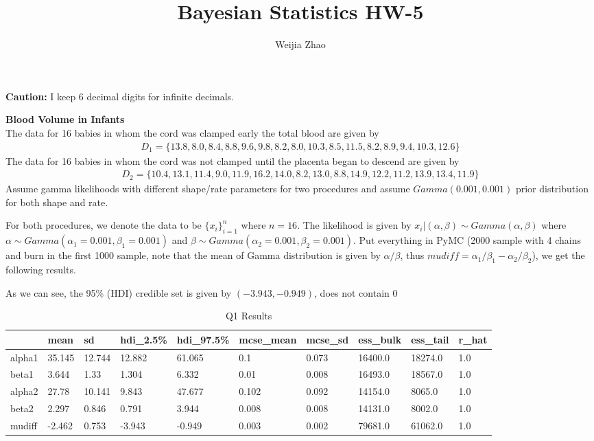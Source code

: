 \documentclass{homeworg}
\title{Bayesian Statistics HW-5}
\author{Weijia Zhao}
\begin{document}
\maketitle

\textbf{Caution:} I keep 6 decimal digits for infinite decimals.

\exercise 
\textbf{Blood Volume in Infants} \\
The data for 16 babies in whom the cord was clamped early the total blood are given by 
\begin{align*}
D_1=\{13.8,8.0,8.4,8.8,9.6,9.8,8.2,8.0,10.3,8.5,11.5,8.2,8.9,9.4,10.3,12.6\}
\end{align*}
The data for 16 babies in whom the cord was not clamped until the placenta began to descend are given by 
\begin{align*}
D_2=\{10.4,13.1,11.4,9.0,11.9,16.2,14.0,8.2,13.0,8.8,14.9,12.2,11.2,13.9,13.4,11.9\}
\end{align*}
Assume gamma likelihoods with different shape/rate parameters for two procedures and assume $Gamma(0.001,0.001)$ prior distribution for both shape and rate.

For both procedures, we denote the data to be $\{x_i\}_{i=1}^n$ where $n=16$. The likelihood is given by $x_i|(\alpha,\beta)\sim Gamma(\alpha,\beta)$ where $\alpha \sim Gamma(\alpha_1=0.001,\beta_1=0.001)$ and $\beta \sim Gamma(\alpha_2=0.001,\beta_2=0.001)$. Put everything in PyMC (2000 sample with 4 chains and burn in the first 1000 sample, note that the mean of Gamma distribution is given by $\alpha/\beta$, thus $mudiff=\alpha_1/\beta_1-\alpha_2/\beta_2$), we get the following results.

As we can see, the 95\%  (HDI) credible set is given by $(-3.943,-0.949)$, does not contain 0
\begin{table}[h]
\caption{Q1 Results}
	\begin{tabular}{llllllllll}
		\hline \hline 
		       & mean   & sd     & hdi\_2.5\% & hdi\_97.5\% & mcse\_mean & mcse\_sd & ess\_bulk & ess\_tail & r\_hat \\ \hline
		alpha1 & 35.145 & 12.744 & 12.882     & 61.065      & 0.1        & 0.073    & 16400.0   & 18274.0   & 1.0    \\
		beta1  & 3.644  & 1.33   & 1.304      & 6.332       & 0.01       & 0.008    & 16493.0   & 18567.0   & 1.0    \\
		alpha2 & 27.78  & 10.141 & 9.843      & 47.677      & 0.102      & 0.092    & 14154.0   & 8065.0    & 1.0    \\
		beta2  & 2.297  & 0.846  & 0.791      & 3.944       & 0.008      & 0.008    & 14131.0   & 8002.0    & 1.0    \\
		mudiff & -2.462 & 0.753  & -3.943     & -0.949      & 0.003      & 0.002    & 79681.0   & 61062.0   & 1.0     \\ \hline\hline
	\end{tabular}
\end{table}
\end{document}
